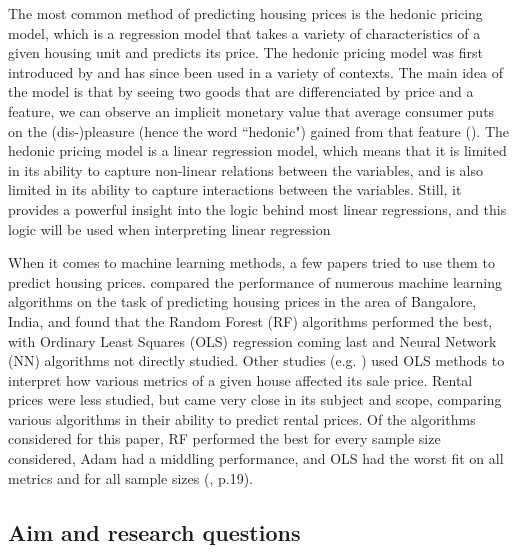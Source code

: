 \documentclass[12pt]{report}
\begin{document}
The most common method of predicting housing prices is the hedonic pricing model, which is a regression model that takes a variety of characteristics of a given housing unit and predicts its price. The hedonic pricing model was first introduced by \cite{rosen1974} and has since been used in a variety of contexts. The main idea of the model is that by seeing two goods that are differenciated by price and a feature, we can observe an implicit monetary value that average consumer puts on the (dis-)pleasure (hence the word ``hedonic") gained from that feature (\cite{taylor2003}). The hedonic pricing model is a linear regression model, which means that it is limited in its ability to capture non-linear relations between the variables, and is also limited in its ability to capture interactions between the variables. Still, it provides a powerful insight into the logic behind most linear regressions, and this logic will be used when interpreting linear regression

When it comes to machine learning methods, a few papers tried to use them to predict housing prices. \cite{joshi2022} compared the performance of numerous machine learning algorithms on the task of predicting housing prices in the area of Bangalore, India, and found that the Random Forest (RF) algorithms performed the best, with Ordinary Least Squares (OLS) regression coming last and Neural Network (NN) algorithms not directly studied. Other studies (e.g. \cite{zietz2008}) used OLS methods to interpret how various metrics of a given house affected its sale price. Rental prices were less studied, but \cite{yoshida2022} came very close in its subject and scope, comparing various algorithms in their ability to predict rental prices. Of the algorithms considered for this paper, RF performed the best for every sample size considered, Adam had a middling performance, and OLS had the worst fit on all metrics and for all sample sizes (\cite{yoshida2022}, p.19).

\subsection{Aim and research questions}
\end{document}
